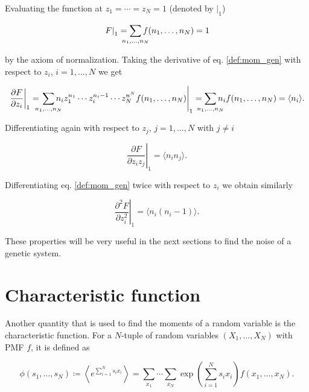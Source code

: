 Evaluating the function at $z_1 = \dotsb = z_N = 1$ (denoted by $\left. \right|_1$)

\begin{equation}
  \label{eq:con-mom_gen_1}
  \left.F\right|_1 = \sum_{\mathclap{n_1,\dotsc,n_N}}f(n_1,\dotsc,n_N) = 1
\end{equation}

by the axiom of normalization. Taking the derivative of eq. \eqref{def:mom_gen} with respect to $z_i$, $i = 1,\dotsc,N$ we get

\begin{equation}
  \label{eq:con-mom_gen_d1}
  \left.\frac{\partial F}{\partial z_i}\right|_1 = \left.\sum_{\mathclap{n_1,\dotsc,n_N}}n_i z_1^{n_1}\dotsm z_i^{n_i-1}\dotsm z_N^{n^N}f(n_1,\dotsc,n_N)\right|_1 = \sum_{\mathclap{n_1,\dotsc,n_N}} n_i f(n_1,\dotsc,n_N) = \langle n_i \rangle.
\end{equation}

Differentiating again with respect to $z_j$, $j=1,\dotsc,N$ with $j\neq i$

\begin{equation}
  \label{eq:con-mom_gen_d1d2}
  \left. \frac{\partial F}{\partial z_i z_j} \right|_1 = \langle n_i n_j \rangle.
\end{equation}

Differentiating eq. \eqref{def:mom_gen} twice with respect to $z_i$ we obtain similarly

\begin{equation}
  \label{eq:con-mom_gen_d1d1}
  \left. \frac{\partial^2F}{\partial z_i^2}\right|_1 = \langle n_i(n_i-1) \rangle.
\end{equation}

These properties will be very useful in the next sections to find the noise of a genetic system.

\section{Characteristic function}
\label{sec:con-charac_func}
Another quantity that is used to find the moments of a random variable is the characteristic function. For a $N$-tuple of random variables $(X_1,\dotsc,X_N)$ with PMF $f$, it is defined as

\begin{equation*}
  \phi(s_1,\dotsc,s_N)\coloneqq \left\langle e^{\sum_{i=1}^Ns_ix_i}\right\rangle = \sum_{x_1}\dotsi\sum_{x_N}\exp\left(\sum_{i=1}^Ns_ix_i\right)f(x_1,\dotsc,x_N).
\end{equation*}

